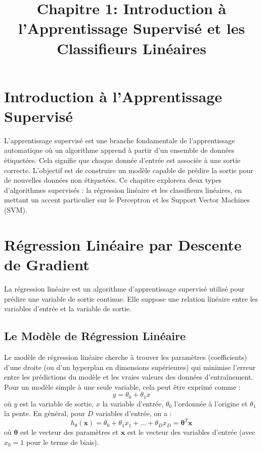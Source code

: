 \documentclass{article}
\title{Chapitre 1: Introduction à l'Apprentissage Supervisé et les Classifieurs Linéaires}
\author{}
\date{}
\begin{document}
\maketitle

\tableofcontents

\section{Introduction à l'Apprentissage Supervisé}
L'apprentissage supervisé est une branche fondamentale de l'apprentissage automatique où un algorithme apprend à partir d'un ensemble de données étiquetées. Cela signifie que chaque donnée d'entrée est associée à une sortie correcte. L'objectif est de construire un modèle capable de prédire la sortie pour de nouvelles données non étiquetées. Ce chapitre explorera deux types d'algorithmes supervisés : la régression linéaire et les classifieurs linéaires, en mettant un accent particulier sur le Perceptron et les Support Vector Machines (SVM).

\section{Régression Linéaire par Descente de Gradient}
La régression linéaire est un algorithme d'apprentissage supervisé utilisé pour prédire une variable de sortie continue. Elle suppose une relation linéaire entre les variables d'entrée et la variable de sortie.

\subsection{Le Modèle de Régression Linéaire}
Le modèle de régression linéaire cherche à trouver les paramètres (coefficients) d'une droite (ou d'un hyperplan en dimensions supérieures) qui minimise l'erreur entre les prédictions du modèle et les vraies valeurs des données d'entraînement. Pour un modèle simple à une seule variable, cela peut être exprimé comme :
$$y = \theta_0 + \theta_1 x$$
où $y$ est la variable de sortie, $x$ la variable d'entrée, $\theta_0$ l'ordonnée à l'origine et $\theta_1$ la pente. En général, pour $D$ variables d'entrée, on a :
$$h_\theta(\mathbf{x}) = \theta_0 + \theta_1 x_1 + \dots + \theta_D x_D = \mathbf{\theta}^T \mathbf{x}$$
où $\mathbf{\theta}$ est le vecteur des paramètres et $\mathbf{x}$ est le vecteur des variables d'entrée (avec $x_0=1$ pour le terme de biais).
\end{document}
